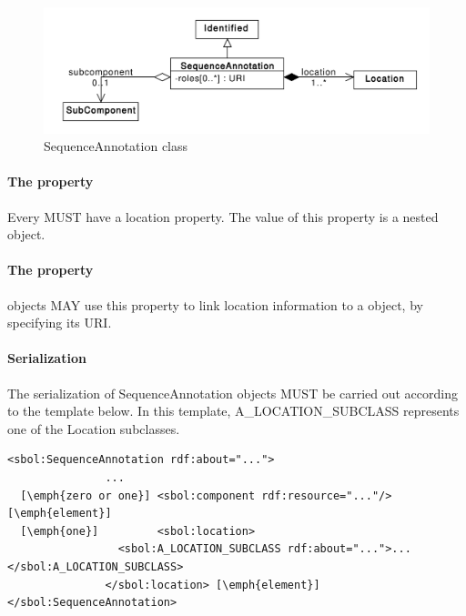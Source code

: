 
\begin{figure}[ht]
\begin{center}
\includegraphics[scale=0.6]{uml/sequence_annotation}
\caption[]{SequenceAnnotation class}
\label{uml:sequence_annotation}
\end{center}
\end{figure}

\paragraph{The  property}
Every  MUST have a location property. The value of this property is a nested  object.

\paragraph{The  property}
 objects MAY use this property to link location information to a  object, by specifying its URI.


\paragraph{Serialization}

The serialization of SequenceAnnotation objects MUST be carried out according to the template below. In this template, A\_LOCATION\_SUBCLASS represents one of the Location subclasses.
\begin{lstlisting}
<sbol:SequenceAnnotation rdf:about="...">
               ...   
  [\emph{zero or one}] <sbol:component rdf:resource="..."/> [\emph{element}] 
  [\emph{one}]         <sbol:location>
                 <sbol:A_LOCATION_SUBCLASS rdf:about="...">...</sbol:A_LOCATION_SUBCLASS>
               </sbol:location> [\emph{element}] 
</sbol:SequenceAnnotation>
\end{lstlisting}

